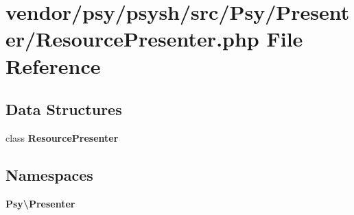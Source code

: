 \section{vendor/psy/psysh/src/\+Psy/\+Presenter/\+Resource\+Presenter.php File Reference}
\label{_resource_presenter_8php}
\subsection*{Data Structures}
\begin{DoxyCompactItemize}
\item 
class {\bf Resource\+Presenter}
\end{DoxyCompactItemize}
\subsection*{Namespaces}
\begin{DoxyCompactItemize}
\item 
 {\bf Psy\textbackslash{}\+Presenter}
\end{DoxyCompactItemize}
